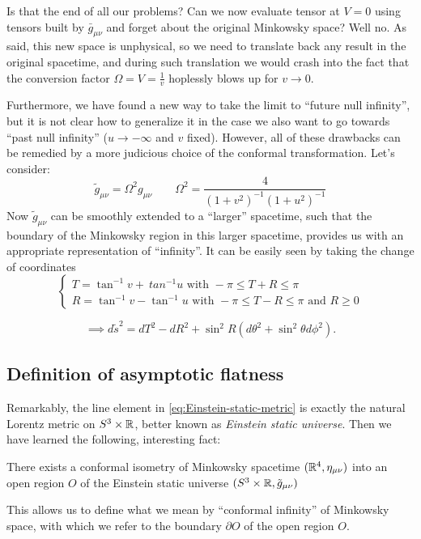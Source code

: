Is that the end of all our problems? Can we now evaluate tensor at \(V = 0\) using tensors built by \(\bar{g}_{\mu\nu}\) and forget about the original Minkowsky space?
Well no. As said, this new space is unphysical, so we need to translate back any result in the original spacetime, and during such translation we would crash into the fact that the conversion factor \(\Omega = V= \frac{1}{v}\) hoplessly blows up for \(v \rightarrow 0\).

Furthermore, we have found a new way to take the limit to ``future null infinity'', but it is not clear how to generalize it in the case we also want to go towards ``past null infinity'' (\(u \rightarrow -\infty\) and \(v\) fixed). However, all of these drawbacks can be remedied by a more judicious choice of the conformal transformation. Let's consider:
\[
\tilde{g}_{\mu\nu} = \Omega^2 g_{\mu\nu} \quad\quad \Omega^2 = \frac{4}{(1 + v^2)^{-1}(1 + u^2)^{-1}} 
\]
Now \(\tilde{g}_{\mu\nu}\) can be smoothly extended to a ``larger'' spacetime, such that the boundary of the Minkowsky region in this larger spacetime, provides us with an appropriate representation of ``infinity''.
It can be easily seen by taking the change of coordinates
\[
\begin{cases}
T = \tan^{-1}v +\ tan^{-1}u \text{ with } -\pi \le T + R \le \pi\\
R = \tan^{-1}v - \tan^{-1}u \text{ with } -\pi \le T - R \le \pi \text{ and } R \ge 0
\end{cases}
\]

\begin{equation}
\label{eq:Einstein-static-metric}
	\implies
	d\tilde{s}^2 = dT^2 - dR^2 + \sin^2R(d\theta^2 + \sin^2\theta d\phi^2).
\end{equation}

\subsection{Definition of asymptotic flatness}
Remarkably, the line element in \eqref{eq:Einstein-static-metric} is exactly the natural Lorentz metric on \(S^3 \times {\mathbb{R}}\), better known as \emph{Einstein static universe}. Then we have learned the following, interesting fact:
\begin{prop}
	There exists a conformal isometry of Minkowsky spacetime \(({\mathbb{R}}^4, \eta_{\mu\nu})\) into an open region \(O\) of the Einstein static universe \((S^3 \times {\mathbb{R}}, \tilde{g}_{\mu\nu})\)
\end{prop}

This allows us to define what we mean by ``conformal infinity'' of Minkowsky space, with which we refer to the boundary \(\partial O\) of the open region \(O\).

